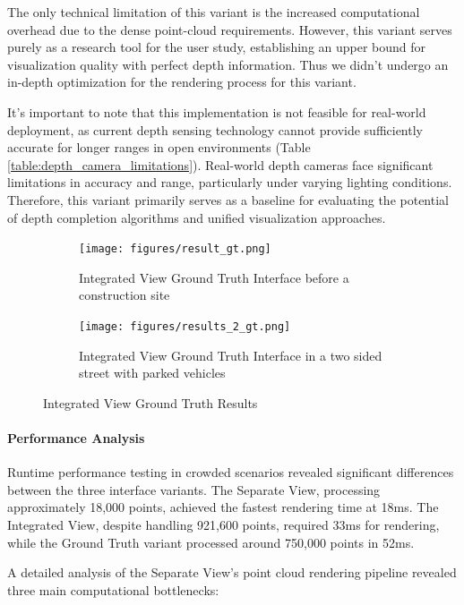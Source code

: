 The only technical limitation of this variant is the increased computational overhead due to the dense point-cloud requirements. However, this variant serves purely as a research tool for the user study, establishing an upper bound for visualization quality with perfect depth information. Thus we didn't undergo an in-depth optimization for the rendering process for this variant.

It's important to note that this implementation is not feasible for real-world deployment, as current depth sensing technology cannot provide sufficiently accurate for longer ranges in open environments (Table \ref{table:depth_camera_limitations}). Real-world depth cameras face significant limitations in accuracy and range, particularly under varying lighting conditions. Therefore, this variant primarily serves as a baseline for evaluating the potential of depth completion algorithms and unified visualization approaches.

\begin{figure}[h]
    \centering
    \begin{subfigure}{0.8\textwidth}
        \texttt{[image: figures/result\_gt.png]}
        \centering
        \caption{Integrated View Ground Truth Interface before a construction site}
        \label{fig:res_gt_1}
    \end{subfigure}
    \begin{subfigure}{0.8\textwidth}
        \texttt{[image: figures/results\_2\_gt.png]}
        \centering
        \caption{Integrated View Ground Truth Interface in a two sided street with parked vehicles}
        \label{fig:res_gt_2}
    \end{subfigure}
    \caption{Integrated View Ground Truth Results}
    \label{fig:res_gt}
\end{figure}

\paragraph{Performance Analysis}
Runtime performance testing in crowded scenarios revealed significant differences between the three interface variants. The Separate View, processing approximately 18,000 points, achieved the fastest rendering time at 18ms. The Integrated View, despite handling 921,600 points, required 33ms for rendering, while the Ground Truth variant processed around 750,000 points in 52ms.

A detailed analysis of the Separate View's point cloud rendering pipeline revealed three main computational bottlenecks:

